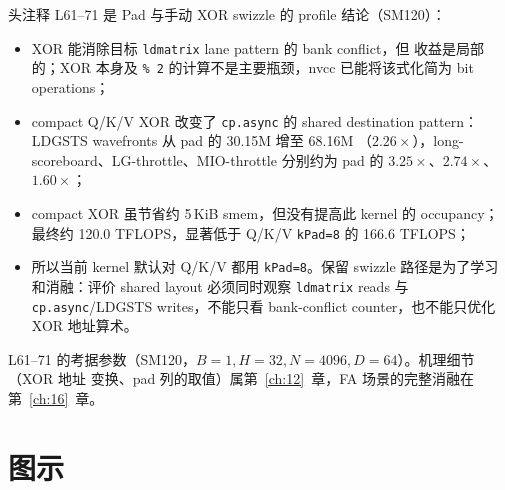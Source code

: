 头注释 L61--71 是 Pad 与手动 XOR swizzle 的 profile 结论（SM120）：
\begin{itemize}
  \item XOR 能消除目标 \texttt{ldmatrix} lane pattern 的 bank conflict，但
        收益是局部的；XOR 本身及 \texttt{\% 2} 的计算不是主要瓶颈，nvcc
        已能将该式化简为 bit operations；
  \item compact Q/K/V XOR 改变了 \texttt{cp.async} 的 shared destination
        pattern：LDGSTS wavefronts 从 pad 的 30.15M 增至 68.16M
        （$2.26\times$），long-scoreboard、LG-throttle、MIO-throttle 分别约为
        pad 的 $3.25\times$、$2.74\times$、$1.60\times$；
  \item compact XOR 虽节省约 5\,KiB smem，但没有提高此 kernel 的 occupancy；
        最终约 120.0 TFLOPS，显著低于 Q/K/V \texttt{kPad=8} 的 166.6
        TFLOPS；
  \item 所以当前 kernel 默认对 Q/K/V 都用 \texttt{kPad=8}。保留 swizzle
        路径是为了学习和消融：评价 shared layout 必须同时观察
        \texttt{ldmatrix} reads 与 \texttt{cp.async}/LDGSTS writes，不能只看
        bank-conflict counter，也不能只优化 XOR 地址算术。
\end{itemize}

L61--71 的考据参数（SM120，$B{=}1, H{=}32, N{=}4096, D{=}64$）。机理细节（XOR 地址
变换、pad 列的取值）属第~\ref{ch:12}~章，FA 场景的完整消融在第~\ref{ch:16}~章。

\needspace{134mm}

\section{图示}


